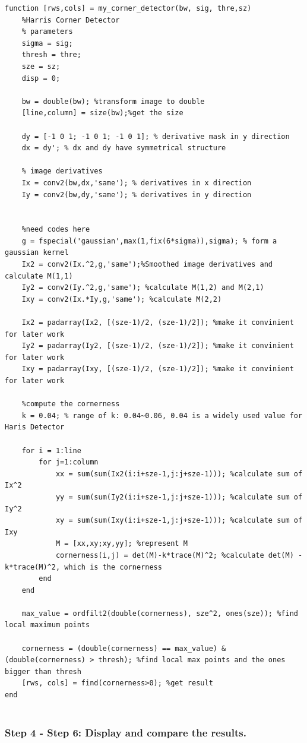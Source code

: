 \documentclass{article}
\begin{document}
\begin{lstlisting}
function [rws,cols] = my_corner_detector(bw, sig, thre,sz)
    %Harris Corner Detector
    % parameters
    sigma = sig;
    thresh = thre;
    sze = sz;
    disp = 0;
    
    bw = double(bw); %transform image to double
    [line,column] = size(bw);%get the size
    
    dy = [-1 0 1; -1 0 1; -1 0 1]; % derivative mask in y direction
    dx = dy'; % dx and dy have symmetrical structure

    % image derivatives
    Ix = conv2(bw,dx,'same'); % derivatives in x direction
    Iy = conv2(bw,dy,'same'); % derivatives in y direction


    %need codes here
    g = fspecial('gaussian',max(1,fix(6*sigma)),sigma); % form a gaussian kernel
    Ix2 = conv2(Ix.^2,g,'same');%Smoothed image derivatives and calculate M(1,1)
    Iy2 = conv2(Iy.^2,g,'same'); %calculate M(1,2) and M(2,1)
    Ixy = conv2(Ix.*Iy,g,'same'); %calculate M(2,2)

    Ix2 = padarray(Ix2, [(sze-1)/2, (sze-1)/2]); %make it convinient for later work
    Iy2 = padarray(Iy2, [(sze-1)/2, (sze-1)/2]); %make it convinient for later work
    Ixy = padarray(Ixy, [(sze-1)/2, (sze-1)/2]); %make it convinient for later work

    %compute the cornerness
    k = 0.04; % range of k: 0.04~0.06, 0.04 is a widely used value for Haris Detector
    
    for i = 1:line
        for j=1:column
            xx = sum(sum(Ix2(i:i+sze-1,j:j+sze-1))); %calculate sum of Ix^2
            yy = sum(sum(Iy2(i:i+sze-1,j:j+sze-1))); %calculate sum of Iy^2
            xy = sum(sum(Ixy(i:i+sze-1,j:j+sze-1))); %calculate sum of Ixy
            M = [xx,xy;xy,yy]; %represent M
            cornerness(i,j) = det(M)-k*trace(M)^2; %calculate det(M) - k*trace(M)^2, which is the cornerness
        end
    end

    max_value = ordfilt2(double(cornerness), sze^2, ones(sze)); %find local maximum points

    cornerness = (double(cornerness) == max_value) & (double(cornerness) > thresh); %find local max points and the ones bigger than thresh
    [rws, cols] = find(cornerness>0); %get result
end


\end{lstlisting}

\subsubsection*{Step 4 - Step 6: Display and compare the results.}
\end{document}
